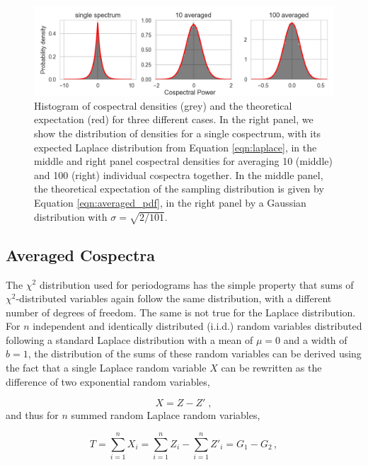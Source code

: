 \documentclass[12pt]{emulateapj}
\begin{document}
\begin{figure}
\begin{center}
\includegraphics[width=\textwidth]{avg_dist.png}
\caption{Histogram of cospectral densities (grey) and the theoretical expectation (red) for three different cases. In the right panel, we show the distribution of densities for a single cospectrum, with its expected Laplace distribution from Equation \ref{eqn:laplace}, in the middle and right panel cospectral densities for averaging 10 (middle) and 100 (right) individual cospectra together. In the middle panel, the theoretical expectation of the sampling distribution is given by Equation \ref{eqn:averaged_pdf}, in the right panel by a Gaussian distribution with $\sigma=\sqrt{2/101}$.}
\label{fig:avg_dist}
\end{center}
\end{figure}


\subsection{Averaged Cospectra}
\label{sec:averaged_cospectra}

The $\chi^2$ distribution used for periodograms has the simple property that sums of $\chi^2$-distributed variables again follow the same distribution, with a different number of degrees of freedom. The same is not true for the Laplace distribution. For $n$ independent and identically distributed (i.i.d.) random variables distributed following a standard Laplace distribution with a mean of $\mu = 0$ and a width of $b = 1$, the distribution of the sums of these random variables can be derived using the fact that a single Laplace random variable $X$ can be rewritten as the difference of two exponential random variables, 

\[
X = Z - Z' \; ,
\]
\noindent and thus for $n$ summed random Laplace random variables,

\begin{equation}
T = \sum_{i=1}^{n} X_i = \sum_{i=1}^{n}Z_i - \sum_{i=1}^{n} Z'_i = G_1 - G_2 \, ,
\end{equation}
\end{document}
